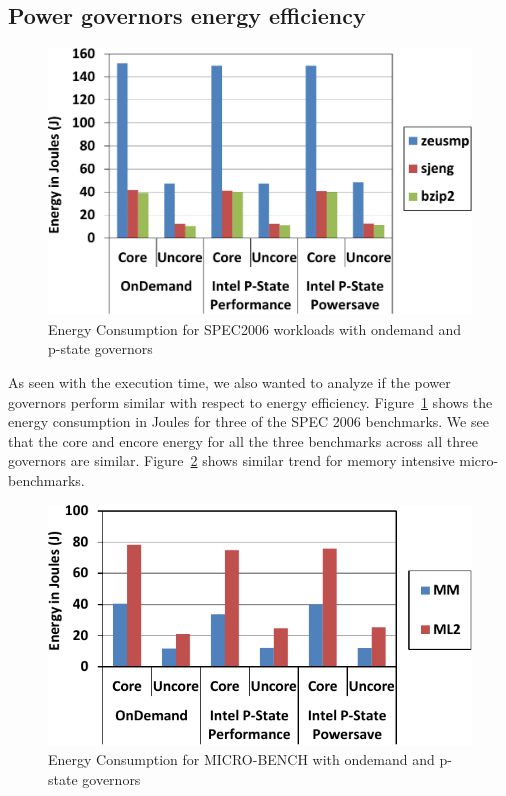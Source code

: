 \subsection{Power governors energy efficiency}
\begin{figure}[h]
  \begin{center}
\includegraphics[width=\linewidth]{figs/def-drivers-spec-crop.pdf}
  \end{center}
  \vspace{-0.1in}
  \caption{Energy Consumption for SPEC2006 workloads with ondemand and p-state governors}
  \label{fig:spec-energy}
\end{figure}

As seen with the execution time, we also wanted to analyze
if the power governors perform similar with respect to energy efficiency.
Figure~\ref{fig:spec-energy} shows the energy consumption in Joules for three of the SPEC 2006
benchmarks. We see that the core and encore energy for all the three 
benchmarks across all three governors are similar.  
Figure~\ref{fig:micro-energy} shows similar trend for memory intensive micro-benchmarks.


\begin{figure}[h]
  \begin{center}
\includegraphics[width=\linewidth]{figs/def-drivers-micro-crop.pdf}
  \end{center}
  \vspace{-0.1in}
  \caption{Energy Consumption for MICRO-BENCH with ondemand and p-state governors}
	\label{fig:micro-energy}
\end{figure}

